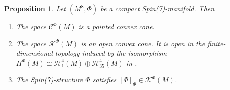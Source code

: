\documentclass[10pt,a4paper,reqno]{article}
\newtheorem{proposition}[theorem]{Proposition}
\theoremstyle{definition}
\numberwithin{equation}{section}
\def\cC{\mathcal{C}}
\def\cH{\mathcal{H}}
\def\cK{\mathcal{K}}
\begin{document}
\begin{proposition}\label{prop:conesprop}
Let $(M^8,\Phi)$ be a compact Spin(7)-manifold. Then
\begin{enumerate}[(1)]
    \item \label{part1cones} The space $\cC^{\Phi}(M)$ is a pointed convex cone.
    \item \label{part2cones} The space $\cK^{\Phi}(M)$ is an open convex cone. It is open in the finite-dimensional topology induced by the isomorphism $H^{\Phi}(M)\cong \cH^4_1(M)\oplus \cH^4_{35}(M)$ in .
    \item \label{part3cones} The Spin(7)-structure $\Phi$ satisfies $[\Phi]_{\Phi}\in \cK^{\Phi}(M)$.
\end{enumerate}
\end{proposition}
\end{document}
